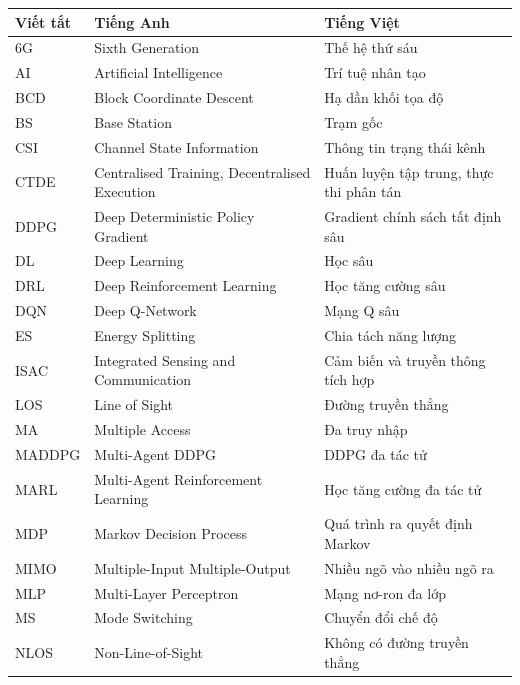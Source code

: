 \renewcommand{\arraystretch}{1.2}
\setlength{\tabcolsep}{4pt}
\begin{longtable}{p{2cm} p{7cm} p{5.5cm}}
\toprule
\textbf{Viết tắt} & \textbf{Tiếng Anh} & \textbf{Tiếng Việt} \\
\midrule
\endhead
6G   & Sixth Generation                       & Thế hệ thứ sáu \\
AI   & Artificial Intelligence                & Trí tuệ nhân tạo \\
BCD  & Block Coordinate Descent               & Hạ dần khối tọa độ \\
BS   & Base Station                           & Trạm gốc \\
CSI  & Channel State Information              & Thông tin trạng thái kênh \\
CTDE & Centralised Training, Decentralised Execution & Huấn luyện tập trung, thực thi phân tán \\
DDPG & Deep Deterministic Policy Gradient     & Gradient chính sách tất định sâu \\
DL   & Deep Learning                          & Học sâu \\
DRL  & Deep Reinforcement Learning            & Học tăng cường sâu \\
DQN  & Deep Q-Network                         & Mạng Q sâu \\
ES   & Energy Splitting                       & Chia tách năng lượng \\
ISAC & Integrated Sensing and Communication   & Cảm biến và truyền thông tích hợp \\
LOS  & Line of Sight                          & Đường truyền thẳng \\
MA   & Multiple Access                        & Đa truy nhập \\
MADDPG & Multi-Agent DDPG                     & DDPG đa tác tử \\
MARL & Multi-Agent Reinforcement Learning     & Học tăng cường đa tác tử \\
MDP  & Markov Decision Process                & Quá trình ra quyết định Markov \\
MIMO & Multiple-Input Multiple-Output         & Nhiều ngõ vào nhiều ngõ ra \\
MLP  & Multi-Layer Perceptron                 & Mạng nơ-ron đa lớp \\
MS   & Mode Switching                         & Chuyển đổi chế độ \\
NLOS & Non-Line-of-Sight                      & Không có đường truyền thẳng \\

\end{longtable}

